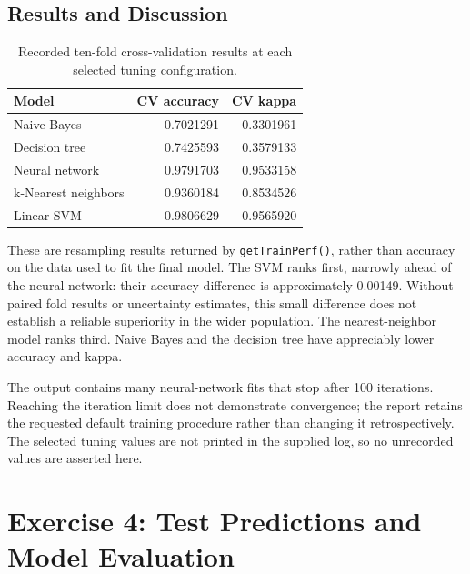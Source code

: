 \documentclass[11pt,a4paper]{article}
\begin{document}
\subsection{Results and Discussion}

\begin{table}[htbp]\centering
    \begin{tabular}{lrr}\toprule
        Model               & CV accuracy & CV kappa  \\\midrule
        Naive Bayes         & 0.7021291   & 0.3301961 \\
        Decision tree       & 0.7425593   & 0.3579133 \\
        Neural network      & 0.9791703   & 0.9533158 \\
        k-Nearest neighbors & 0.9360184   & 0.8534526 \\
        Linear SVM          & 0.9806629   & 0.9565920 \\\bottomrule
    \end{tabular}
    \caption{Recorded ten-fold cross-validation results at each selected tuning configuration.}
\end{table}
These are resampling results returned by \texttt{getTrainPerf()}, rather than accuracy on the data used to fit the final model. The SVM ranks first, narrowly ahead of the neural network: their accuracy difference is approximately 0.00149. Without paired fold results or uncertainty estimates, this small difference does not establish a reliable superiority in the wider population. The nearest-neighbor model ranks third. Naive Bayes and the decision tree have appreciably lower accuracy and kappa.

The output contains many neural-network fits that stop after 100 iterations. Reaching the iteration limit does not demonstrate convergence; the report retains the requested default training procedure rather than changing it retrospectively. The selected tuning values are not printed in the supplied log, so no unrecorded values are asserted here.

\section{Exercise 4: Test Predictions and Model Evaluation}
\end{document}
